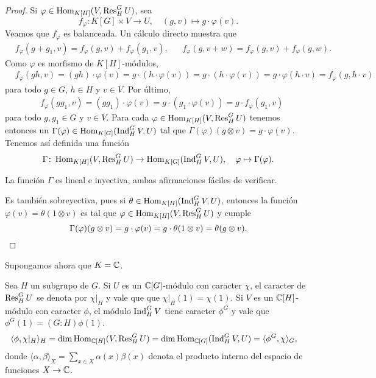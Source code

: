 \begin{proof}
Si $\varphi\in\operatorname{Hom}_{K[H]}(V,\operatorname{Res}_H^GU)$, sea 
\[
f_{\varphi}\colon K[G]\times V\to U,
\quad
(g,v)\mapsto g\cdot\varphi(v).
\]
Veamos que $f_{\varphi}$ es balanceada. Un cálculo directo muestra que
\begin{align*}
    &f_{\varphi}(g+g_1,v)=f_{\varphi}(g,v)+f_{\varphi}(g_1,v),&&
    f_{\varphi}(g,v+w)=f_{\varphi}(g,v)+f_{\varphi}(g,w).
\end{align*}
Como $\varphi$ es morfismo de $K[H]$-módulos,
\begin{align*}
    &f_{\varphi}(gh,v)=(gh)\cdot\varphi(v)
    =g\cdot (h\cdot \varphi(v))
    =g\cdot (h\cdot\varphi(v))
    =g\cdot \varphi(h\cdot v)=f_{\varphi}(g,h\cdot v)
\end{align*}
para todo $g\in G$, $h\in H$ y $v\in V$. Por último,
\begin{align*}
    &f_{\varphi}(gg_1,v)=(gg_1)\cdot\varphi(v)=g\cdot(g_1\cdot\varphi(v))=g\cdot f_{\varphi}(g_1,v)
\end{align*}
para todo $g,g_1\in G$ y $v\in V$. Para cada $\varphi\in\operatorname{Hom}_{K[H]}(V,\operatorname{Res}_H^GU)$ tenemos 
entonces un $\Gamma(\varphi)\in\operatorname{Hom}_{K[G]}(\operatorname{Ind}_H^GV,U)$ tal que
$\Gamma(\varphi)(g\otimes v)=g\cdot\varphi(v)$. 
Tenemos así definida una función 
\[
\Gamma\colon \operatorname{Hom}_{K[H]}(V,\operatorname{Res}_H^GU)\to\operatorname{Hom}_{K[G]}(\operatorname{Ind}_H^GV,U),
\quad
\varphi\mapsto\Gamma(\varphi).
\]

La función $\Gamma$ es lineal e inyectiva, ambas afirmaciones fáciles de verificar. 

Es también sobreyectiva, pues si $\theta\in\operatorname{Hom}_{K[H]}(\operatorname{Ind}_H^GV,U)$, entonces
la función $\varphi(v)=\theta(1\otimes v)$ es tal que $\varphi\in\operatorname{Hom}_{K[H]}(V,\operatorname{Res}_H^GU)$ y 
cumple 
\[
\Gamma(\varphi)(g\otimes v)=g\cdot\varphi(v)=g\cdot\theta(1\otimes v)=\theta(g\otimes v).\qedhere
\]
\end{proof}

Supongamos ahora que $K=\mathbb{C}$. 

Sea $H$ un subgrupo de $G$. Si $U$ es un $\mathbb{C}[G]$-módulo con caracter $\chi$, el caracter de $\operatorname{Res}_H^GU$ se denota por $\chi|_H$ y vale que 
que $\chi|_H(1)=\chi(1)$. Si $V$ es un $\mathbb{C}[H]$-módulo con 
caracter $\phi$, el módulo $\operatorname{Ind}_H^GV$ tiene caracter $\phi^G$ y vale que $\phi^G(1)=(G:H)\phi(1)$. 
\begin{align*}
\langle \phi,\chi|_H\rangle_H 
&=\dim\operatorname{Hom}_{\mathbb{C}[H]}(V,\operatorname{Res}_H^GU)
=\dim\operatorname{Hom}_{\mathbb{C}[G]}(\operatorname{Ind}_H^GV,U)
=\langle\phi^G,\chi\rangle_G,
\end{align*}
donde $\langle \alpha,\beta\rangle_X=\sum_{x\in X}\alpha(x)\overline{\beta(x)}$ denota el producto 
interno del espacio de funciones $X\to\mathbb{C}$. 

